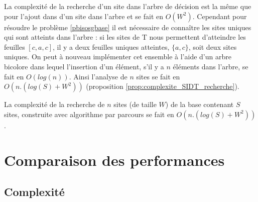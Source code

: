 La complexité de la recherche d'un site dans l'arbre de décision est la même que pour l'ajout dans d'un site dans l'arbre et se fait en $O(W^2)$.
Cependant pour résoudre le problème \ref{pbisosgbase} il est nécessaire de connaître les sites uniques qui sont atteints dans l'arbre : si les sites de T nous permettent d'atteindre les feuilles $[c, a, c]$, il y a deux feuilles uniques atteintes, $\{a, c\}$, soit deux sites uniques.
On peut à nouveau implémenter cet ensemble à l'aide d'un arbre bicolore dans lequel l'insertion d'un élément, s'il y a $n$ éléments dans l'arbre, se fait en $O(log(n))$.
Ainsi l'analyse de $n$ sites se fait en $O(n.(log(S)+W^2))$ (proposition \ref{prop:complexite_SIDT_recherche}). 

\begin{prop}
 La complexité de la recherche de $n$ sites (de taille $W$) de la base contenant $S$ sites, construite avec algorithme par parcours se fait en $O(n.(log(S)+W^2))$.
\label{prop:complexite_SIDT_recherche}
\end{prop}

\section{Comparaison des performances}
\subsection{Complexité}

